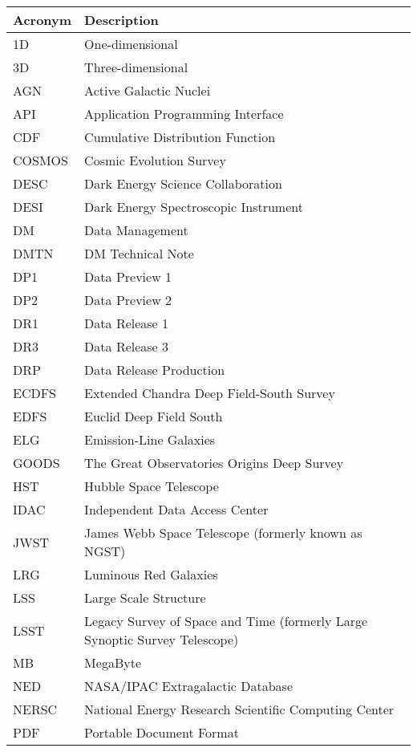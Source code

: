 \addtocounter{table}{-1}
\begin{longtable}{p{}p{}}\hline
\textbf{Acronym} & \textbf{Description}  \\\hline

1D & One-dimensional \\\hline
3D & Three-dimensional \\\hline
AGN & Active Galactic Nuclei \\\hline
API & Application Programming Interface \\\hline
CDF & Cumulative Distribution Function \\\hline
COSMOS & Cosmic Evolution Survey \\\hline
DESC & Dark Energy Science Collaboration \\\hline
DESI & Dark Energy Spectroscopic Instrument \\\hline
DM & Data Management \\\hline
DMTN & DM Technical Note \\\hline
DP1 & Data Preview 1 \\\hline
DP2 & Data Preview 2 \\\hline
DR1 & Data Release 1 \\\hline
DR3 & Data Release 3 \\\hline
DRP & Data Release Production \\\hline
ECDFS & Extended Chandra Deep Field-South Survey \\\hline
EDFS & Euclid Deep Field South \\\hline
ELG & Emission-Line Galaxies \\\hline
GOODS & The Great Observatories Origins Deep Survey \\\hline
HST & Hubble Space Telescope \\\hline
IDAC & Independent Data Access Center \\\hline
JWST & James Webb Space Telescope (formerly known as NGST) \\\hline
LRG & Luminous Red Galaxies \\\hline
LSS & Large Scale Structure \\\hline
LSST & Legacy Survey of Space and Time (formerly Large Synoptic Survey Telescope) \\\hline
MB & MegaByte \\\hline
NED & NASA/IPAC Extragalactic Database \\\hline
NERSC & National Energy Research Scientific Computing Center \\\hline
PDF & Portable Document Format \\\hline

\end{longtable}
